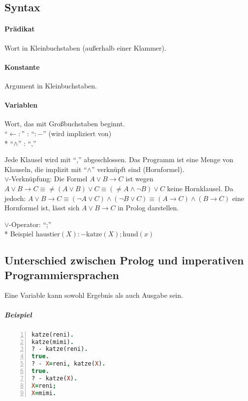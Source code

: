 \documentclass[a4paper]{scrartcl}
\begin{document}
\subsection{Syntax}
\paragraph{Prädikat} Wort in Kleinbuchstaben (außerhalb einer Klammer).
\paragraph{Konstante} Argument in Kleinbuchstaben.
\paragraph{Variablen} Wort, das mit Großbuchstaben beginnt.\\
"`$\leftarrow :$"' : "`$:-$"' (wird impliziert von)\\*
"`$\wedge$"' : "`,"'

Jede Klausel wird mit "`,"' abgeschlossen. Das Programm ist eine Menge von Klauseln, die implizit mit "`$\wedge$"' verknüpft sind (Hornformel).\\
$\vee$-Verknüpfung: Die Formel $A \vee B \rightarrow C$ ist wegen $A \vee B \rightarrow C \equiv \neq (A \vee B) \vee C \equiv (\neq A \wedge \neg B) \vee C$ keine Hornklausel. Da jedoch:
$A \vee B \rightarrow C \equiv (\neg A \vee C) \wedge (\neg B \vee C) \equiv (A \rightarrow C) \wedge (B \rightarrow C)$
eine Hornformel ist, lässt sich $A\vee B \rightarrow C$ in Prolog darstellen.

$\vee$-Operator: "`;"'\\*
Beispiel $\text{haustier}(X) :- \text{katze} (X); \text{hund}(x)$

\subsection{Unterschied zwischen Prolog und imperativen Programmiersprachen}
Eine Variable kann sowohl Ergebnis als auch Ausgabe sein.

\subparagraph{Beispiel}
\begin{lstlisting}[numbers=left, tabsize=4, language=Prolog]
katze(reni).
katze(mimi).
? - katze(reni).
true.
? - X=reni, katze(X).
true.
? - katze(X).
X=reni;
X=mimi.
\end{lstlisting}
\end{document}
